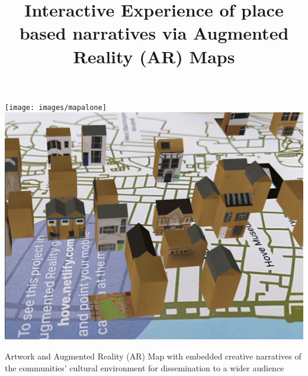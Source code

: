 \documentclass[acmlarge,screen,dvipsnames]{acmart}
\begin{document}
%

\title[Interactive Experience of place based narratives via Augmented Reality (AR) Maps]%
      {Interactive Experience of place based narratives via Augmented Reality (AR) Maps}
%



%
\renewcommand{\shortauthors}{K. Rodriguez, et al.}

%
\begin{teaserfigure}
\centering
 \texttt{[image: images/mapalone]}
 \includegraphics[width=.40\linewidth]{images/screenshoot}
  \caption{Artwork and Augmented Reality (AR) Map
with embedded creative narratives of the communities' cultural environment 
for dissemination to a wider audience\vspace*{0.5\baselineskip}}
  \label{fig:teaser}
\end{teaserfigure}
\end{document}
